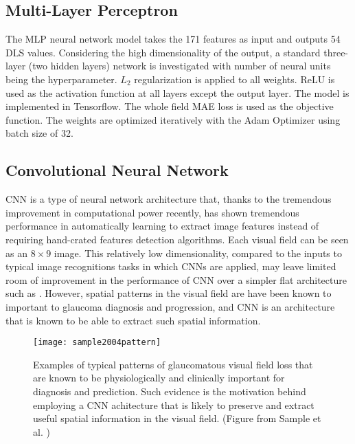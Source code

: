 \subsection{Multi-Layer Perceptron}

The \ac{MLP} neural network model takes the 171 features as input and outputs 54 \ac{DLS} values. Considering the high dimensionality of the output, a standard three-layer (two hidden layers) network is investigated with number of neural units being the hyperparameter. $L_2$ regularization is applied to all weights. ReLU is used as the activation function at all layers except the output layer. The model is implemented in Tensorflow. \cite{tensorflow} The whole field \ac{MAE} loss is used as the objective function. The weights are optimized iteratively with the Adam Optimizer using batch size of 32.

\subsection{Convolutional Neural Network}

\ac{CNN} is a type of neural network architecture that, thanks to the tremendous improvement in computational power recently, has shown tremendous performance in automatically learning to extract image features instead of requiring hand-crated features detection algorithms. Each visual field can be seen as an $8\times9$ image. This relatively low dimensionality, compared to the inputs to typical image recognitions tasks in which \acp{CNN} are applied, may leave limited room of improvement in the performance of \ac{CNN} over a simpler flat architecture such as . However, spatial patterns in the visual field are have been known to important to glaucoma diagnosis and progression, and \ac{CNN} is an architecture that is known to be able to extract such spatial information. 

\begin{figure}[p]
	\centering
	\texttt{[image: sample2004pattern]}
	\caption[Examples of typical patterns of glaucomatous visual field loss]{Examples of typical patterns of glaucomatous visual field loss that are known to be physiologically and clinically important for diagnosis and prediction. Such evidence is the motivation behind employing a \ac{CNN} achitecture that is likely to preserve and extract useful spatial information in the visual field. (Figure from Sample et al. \cite{Sample2004})}
\end{figure}

